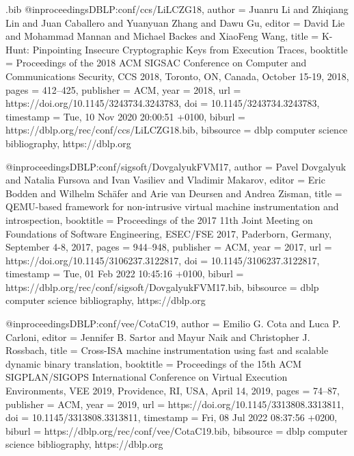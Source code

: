 \begin{filecontents}{\jobname.bib}
@inproceedings{DBLP:conf/ccs/LiLCZG18,
  author       = {Juanru Li and
                  Zhiqiang Lin and
                  Juan Caballero and
                  Yuanyuan Zhang and
                  Dawu Gu},
  editor       = {David Lie and
                  Mohammad Mannan and
                  Michael Backes and
                  XiaoFeng Wang},
  title        = {K-Hunt: Pinpointing Insecure Cryptographic Keys from Execution Traces},
  booktitle    = {Proceedings of the 2018 {ACM} {SIGSAC} Conference on Computer and
                  Communications Security, {CCS} 2018, Toronto, ON, Canada, October
                  15-19, 2018},
  pages        = {412--425},
  publisher    = {{ACM}},
  year         = {2018},
  url          = {https://doi.org/10.1145/3243734.3243783},
  doi          = {10.1145/3243734.3243783},
  timestamp    = {Tue, 10 Nov 2020 20:00:51 +0100},
  biburl       = {https://dblp.org/rec/conf/ccs/LiLCZG18.bib},
  bibsource    = {dblp computer science bibliography, https://dblp.org}
}

@inproceedings{DBLP:conf/sigsoft/DovgalyukFVM17,
  author       = {Pavel Dovgalyuk and
                  Natalia Fursova and
                  Ivan Vasiliev and
                  Vladimir Makarov},
  editor       = {Eric Bodden and
                  Wilhelm Sch{\"{a}}fer and
                  Arie van Deursen and
                  Andrea Zisman},
  title        = {QEMU-based framework for non-intrusive virtual machine instrumentation
                  and introspection},
  booktitle    = {Proceedings of the 2017 11th Joint Meeting on Foundations of Software
                  Engineering, {ESEC/FSE} 2017, Paderborn, Germany, September 4-8, 2017},
  pages        = {944--948},
  publisher    = {{ACM}},
  year         = {2017},
  url          = {https://doi.org/10.1145/3106237.3122817},
  doi          = {10.1145/3106237.3122817},
  timestamp    = {Tue, 01 Feb 2022 10:45:16 +0100},
  biburl       = {https://dblp.org/rec/conf/sigsoft/DovgalyukFVM17.bib},
  bibsource    = {dblp computer science bibliography, https://dblp.org}
}

@inproceedings{DBLP:conf/vee/CotaC19,
  author       = {Emilio G. Cota and
                  Luca P. Carloni},
  editor       = {Jennifer B. Sartor and
                  Mayur Naik and
                  Christopher J. Rossbach},
  title        = {Cross-ISA machine instrumentation using fast and scalable dynamic
                  binary translation},
  booktitle    = {Proceedings of the 15th {ACM} {SIGPLAN/SIGOPS} International Conference
                  on Virtual Execution Environments, {VEE} 2019, Providence, RI, USA,
                  April 14, 2019},
  pages        = {74--87},
  publisher    = {{ACM}},
  year         = {2019},
  url          = {https://doi.org/10.1145/3313808.3313811},
  doi          = {10.1145/3313808.3313811},
  timestamp    = {Fri, 08 Jul 2022 08:37:56 +0200},
  biburl       = {https://dblp.org/rec/conf/vee/CotaC19.bib},
  bibsource    = {dblp computer science bibliography, https://dblp.org}
}

\end{filecontents}